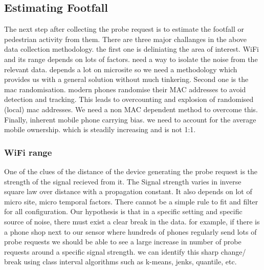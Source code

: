 \subsection{Estimating Footfall}
The next step after collecting the probe request is to estimate the footfall or pedestrian activity from them. There are three major challanges in the above data collection methodology.
the first one is deliniating the area of interest.
WiFi and its range depends on lots of factors.
need a way to isolate the noise from the relevant data. depends a lot on microsite so we need a methodology which provides us with a general solution without much tinkering.
Second one is the mac randomisation.
modern phones randomise their MAC addresses to avoid detection and tracking.
This leads to overcounting and explosion of randomised (local) mac addresses.
We need a non MAC dependent method to overcome this.
Finally, inherent mobile phone carrying bias. we need to account for the average mobile ownership. which is steadily increasing and is not 1:1.

\subsubsection{WiFi range}
One of the clues of the distance of the device generating the probe request is
the strength of the signal recieved from it.
The Signal strength varies in inverse square law over distance with a 
propagation constant.
It also depends on lot of micro site, micro temporal factors.
There cannot be a simple rule to fit and filter for all configuration.
Our hypothesis is that in a specific setting and specific source of noise,
there must exist a clear break in the data.
for example, if there is a phone shop next to our sensor where
hundreds of phones regularly send lots of probe requests
we should be able to see a large increase in number of probe requests around
a specific signal strength.
we can identify this sharp change/ break using class interval algorithms such as
k-means, jenks, quantile, etc.

